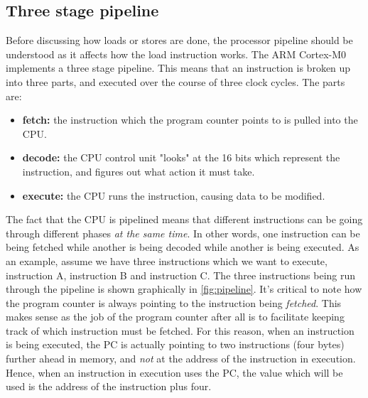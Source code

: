 \subsection{Three stage pipeline}
Before discussing how loads or stores are done, the processor pipeline should be understood as it affects how the load instruction works. 
The ARM Cortex-M0 implements a three stage pipeline. This means that an instruction is broken up into three parts, and executed over the course of three clock cycles. The parts are:
\begin{itemize}
\item \textbf{fetch:} the instruction which the program counter points to is pulled into the CPU.
\item \textbf{decode:} the CPU control unit "looks" at the 16 bits which represent the instruction, and figures out what action it must take.
\item \textbf{execute:} the CPU runs the instruction, causing data to be modified.
\end{itemize}
The fact that the CPU is pipelined means that different instructions can be going through different phases \emph{at the same time}. In other words, one instruction can be being fetched while another is being decoded while another is being executed. 
As an example, assume we have three instructions which we want to execute, instruction A, instruction B and instruction C. The three instructions being run through the pipeline is shown graphically in \autoref{fig:pipeline}. It's critical to note how the program counter is always pointing to the instruction being \emph{fetched}. This makes sense as the job of the program counter after all is to facilitate keeping track of which instruction must be fetched. For this reason, when an instruction is being executed, the PC is actually pointing to two instructions (four bytes) further ahead in memory, and \emph{not} at the address of the instruction in execution. Hence, when an instruction in execution uses the PC, the value which will be used is the address of the instruction plus four.
